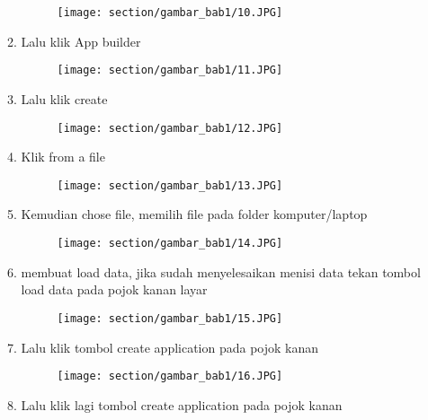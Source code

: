 \begin{enumerate}
\begin{enumerate}
\begin{figure}[!htbp] 
    \centering
    \texttt{[image: section/gambar\_bab1/10.JPG]}
    \label{penanda}
\end{figure}
\vspace{16cm}
    \item Lalu klik App builder
\begin{figure}[!htbp]
    \centering
    \texttt{[image: section/gambar\_bab1/11.JPG]}
    \label{penanda}
\end{figure}
\vspace{16cm}
    \item Lalu klik create
\begin{figure}[!htbp]
    \centering
    \texttt{[image: section/gambar\_bab1/12.JPG]}
    \label{penanda}
\end{figure}
\vspace{16cm}
    \item Klik from a file
\begin{figure}[!htbp]
    \centering
    \texttt{[image: section/gambar\_bab1/13.JPG]}
    \label{penanda}
\end{figure}
\vspace{16cm}
    \item Kemudian chose file, memilih file pada folder komputer/laptop
\begin{figure}[!htbp]
    \centering
    \texttt{[image: section/gambar\_bab1/14.JPG]}
    \label{penanda}
\end{figure}
\vspace{16cm}
    \item membuat load data, jika sudah menyelesaikan menisi data tekan tombol load data pada pojok kanan layar
\begin{figure}[!htbp]
    \centering
    \texttt{[image: section/gambar\_bab1/15.JPG]}
    \label{penanda}
\end{figure}
\vspace{16cm}
    \item Lalu klik tombol create application pada pojok kanan
\begin{figure}[!htbp]
    \centering
    \texttt{[image: section/gambar\_bab1/16.JPG]}
    \label{penanda}
\end{figure}
\vspace{16cm}
    \item Lalu klik lagi tombol create application pada pojok kanan
\begin{figure}[!htbp]
    \centering

\end{figure}
\end{enumerate}
\end{enumerate}
